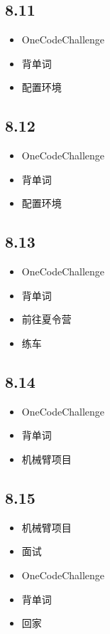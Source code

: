 \documentclass[UTF8]{ctexart}
\begin{document}
\subsection*{8.11}
\begin{itemize}
    \item OneCodeChallenge
    \item 背单词
    \item 配置环境
\end{itemize}

\subsection*{8.12}
\begin{itemize}
    \item OneCodeChallenge
    \item 背单词
    \item 配置环境
\end{itemize}

\subsection*{8.13}
\begin{itemize}
    \item OneCodeChallenge
    \item 背单词
    \item 前往夏令营
    \item 练车
\end{itemize}

\subsection*{8.14}
\begin{itemize}
    \item OneCodeChallenge
    \item 背单词
    \item 机械臂项目
\end{itemize}

\subsection*{8.15}
\begin{itemize}
    \item 机械臂项目
    \item 面试
    \item OneCodeChallenge
    \item 背单词
    \item 回家
\end{itemize}
\end{document}
